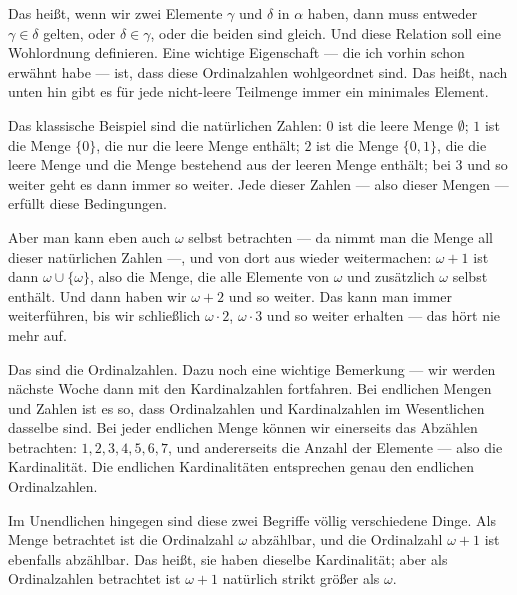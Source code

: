 \begin{math-stroke}
\end{math-stroke}

\begin{spoken-clean}[00:11:11 - 00:13:17]
Das heißt, wenn wir zwei Elemente $\gamma$ und $\delta$ in $\alpha$ haben, dann muss entweder $\gamma \in \delta$ gelten, oder $\delta \in \gamma$, oder die beiden sind gleich. Und diese Relation soll eine Wohlordnung definieren. Eine wichtige Eigenschaft --- die ich vorhin schon erwähnt habe --- ist, dass diese Ordinalzahlen wohlgeordnet sind. Das heißt, nach unten hin gibt es für jede nicht-leere Teilmenge immer ein minimales Element.

Das klassische Beispiel sind die natürlichen Zahlen: $0$ ist die leere Menge $\emptyset$; $1$ ist die Menge $\{0\}$, die nur die leere Menge enthält; $2$ ist die Menge $\{0, 1\}$, die die leere Menge und die Menge bestehend aus der leeren Menge enthält; bei $3$ und so weiter geht es dann immer so weiter. Jede dieser Zahlen --- also dieser Mengen --- erfüllt diese Bedingungen.

Aber man kann eben auch $\omega$ selbst betrachten --- da nimmt man die Menge all dieser natürlichen Zahlen ---, und von dort aus wieder weitermachen: $\omega + 1$ ist dann $\omega \cup \{\omega\}$, also die Menge, die alle Elemente von $\omega$ und zusätzlich $\omega$ selbst enthält. Und dann haben wir $\omega + 2$ und so weiter. Das kann man immer weiterführen, bis wir schließlich $\omega \cdot 2$, $\omega \cdot 3$ und so weiter erhalten --- das hört nie mehr auf.
\end{spoken-clean}

\begin{spoken-clean}[00:13:17 - 00:15:29]
Das sind die Ordinalzahlen. Dazu noch eine wichtige Bemerkung --- wir werden nächste Woche dann mit den Kardinalzahlen fortfahren. Bei endlichen Mengen und Zahlen ist es so, dass Ordinalzahlen und Kardinalzahlen im Wesentlichen dasselbe sind. Bei jeder endlichen Menge können wir einerseits das Abzählen betrachten: $1, 2, 3, 4, 5, 6, 7$, und andererseits die Anzahl der Elemente --- also die Kardinalität. Die endlichen Kardinalitäten entsprechen genau den endlichen Ordinalzahlen.

Im Unendlichen hingegen sind diese zwei Begriffe völlig verschiedene Dinge. Als Menge betrachtet ist die Ordinalzahl $\omega$ abzählbar, und die Ordinalzahl $\omega + 1$ ist ebenfalls abzählbar. Das heißt, sie haben dieselbe Kardinalität; aber als Ordinalzahlen betrachtet ist $\omega + 1$ natürlich strikt größer als $\omega$.
\end{spoken-clean}

